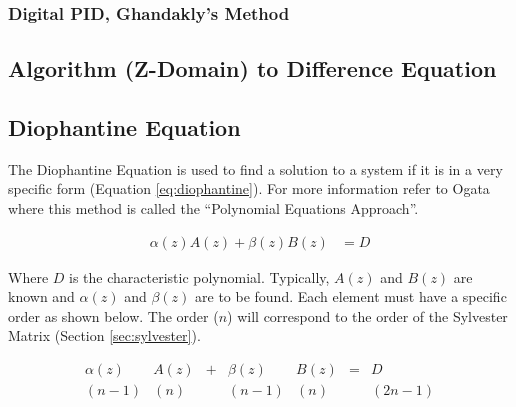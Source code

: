 \documentclass{article}
\newcommand{\sincludepdf}[2][]{
	
}
\begin{document}
\subsubsection{Digital PID, Ghandakly's Method}

\subsection{Algorithm (Z-Domain) to Difference Equation}

\sincludepdf[pages={11},
			pagecommand=\subsubsection*{Example 1}
		]{scan/11211301.pdf}

\sincludepdf[pages={12},
			pagecommand=\subsubsection*{Example 2}
		]{scan/11211301.pdf}

\sincludepdf[pages={13},
			pagecommand=\subsubsection*{Example 3}
		]{scan/11211301.pdf}

\subsection{Diophantine Equation}

The Diophantine Equation is used to find a solution to a system
if it is in a very specific form (Equation \ref{eq:diophantine}).
For more information refer to Ogata\autocite[Pg. 525]{ogata1995discrete}
where this method is called the ``Polynomial Equations Approach''.

\begin{align}
	\alpha(z)A(z) + \beta(z)B(z) &= D \label{eq:diophantine}
\end{align}

Where $D$ is the characteristic polynomial.
Typically, $A(z)$ and $B(z)$ are known and $\alpha(z)$ and $\beta(z)$
are to be found.
Each element must have a specific order as shown below.
The order ($n$) will correspond to the order of the
Sylvester Matrix (Section \ref{sec:sylvester}).

\[
\begin{array}{ccccccc}
	\alpha(z) &A(z) &+ &\beta(z) &B(z) &= &D \\
	  (n-1)   &(n)  &  & (n-1)  &(n) & &(2n-1)
\end{array}
\]
\end{document}
